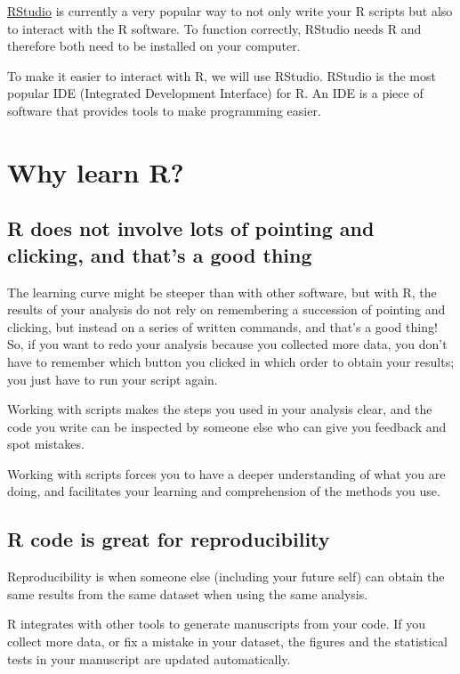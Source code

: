 \documentclass[]{book}
\begin{document}
\href{https://rstudio.com}{RStudio} is currently a very popular way to
not only write your R scripts but also to interact with the R software.
To function correctly, RStudio needs R and therefore both need to be
installed on your computer.

To make it easier to interact with R, we will use RStudio. RStudio is
the most popular IDE (Integrated Development Interface) for R. An IDE is
a piece of software that provides tools to make programming easier.

\section{Why learn R?}\label{why-learn-r}

\subsection{R does not involve lots of pointing and clicking, and that's
a good
thing}\label{r-does-not-involve-lots-of-pointing-and-clicking-and-thats-a-good-thing}

The learning curve might be steeper than with other software, but with
R, the results of your analysis do not rely on remembering a succession
of pointing and clicking, but instead on a series of written commands,
and that's a good thing! So, if you want to redo your analysis because
you collected more data, you don't have to remember which button you
clicked in which order to obtain your results; you just have to run your
script again.

Working with scripts makes the steps you used in your analysis clear,
and the code you write can be inspected by someone else who can give you
feedback and spot mistakes.

Working with scripts forces you to have a deeper understanding of what
you are doing, and facilitates your learning and comprehension of the
methods you use.

\subsection{R code is great for
reproducibility}\label{r-code-is-great-for-reproducibility}

Reproducibility is when someone else (including your future self) can
obtain the same results from the same dataset when using the same
analysis.

R integrates with other tools to generate manuscripts from your code. If
you collect more data, or fix a mistake in your dataset, the figures and
the statistical tests in your manuscript are updated automatically.
\end{document}
